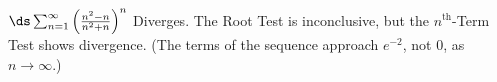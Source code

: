 {$\ds\sum_{n=1}^\infty \left(\frac{n^2-n}{n^2+n}\right)^n$
}
{Diverges. The Root Test is inconclusive, but the $n^\text{th}$-Term Test shows divergence. (The terms of the sequence approach $e^{-2}$, not 0, as $n\to\infty$.)
}